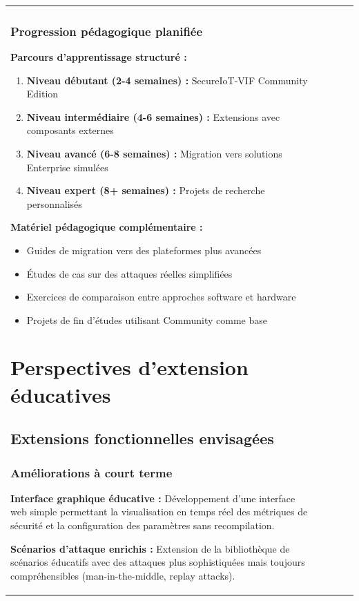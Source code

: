 \begin{table}[h]
\begin{tabular}{|l|c|c|c|c|}
\begin{table}[h]
\begin{table}[h]
\begin{table}[h]
\begin{table}[h]
\begin{table}[h]
\subsubsection{Progression pédagogique planifiée}

\textbf{Parcours d'apprentissage structuré :}
\begin{enumerate}
    \item \textbf{Niveau débutant (2-4 semaines) :} SecureIoT-VIF Community Edition
    \item \textbf{Niveau intermédiaire (4-6 semaines) :} Extensions avec composants externes
    \item \textbf{Niveau avancé (6-8 semaines) :} Migration vers solutions Enterprise simulées
    \item \textbf{Niveau expert (8+ semaines) :} Projets de recherche personnalisés
\end{enumerate}

\textbf{Matériel pédagogique complémentaire :}
\begin{itemize}
    \item Guides de migration vers des plateformes plus avancées
    \item Études de cas sur des attaques réelles simplifiées
    \item Exercices de comparaison entre approches software et hardware
    \item Projets de fin d'études utilisant Community comme base
\end{itemize}

\section{Perspectives d'extension éducatives}

\subsection{Extensions fonctionnelles envisagées}

\subsubsection{Améliorations à court terme}

\textbf{Interface graphique éducative :} Développement d'une interface web simple permettant la visualisation en temps réel des métriques de sécurité et la configuration des paramètres sans recompilation.

\textbf{Scénarios d'attaque enrichis :} Extension de la bibliothèque de scénarios éducatifs avec des attaques plus sophistiquées mais toujours compréhensibles (man-in-the-middle, replay attacks).


\end{table}
\end{table}
\end{table}
\end{table}
\end{table}
\end{tabular}
\end{table}

